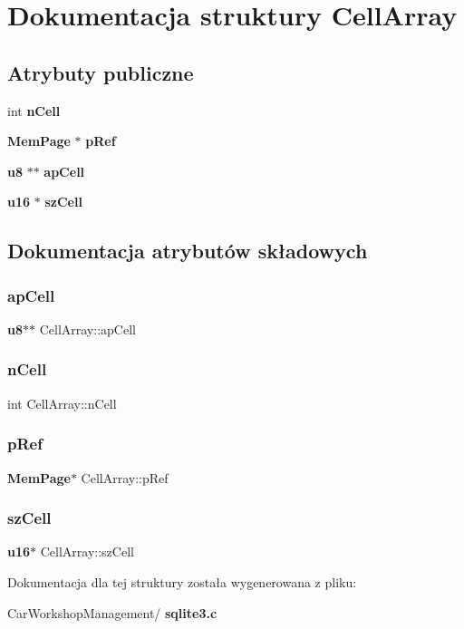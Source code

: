 \section{Dokumentacja struktury Cell\+Array}
\label{struct_cell_array}
\subsection*{Atrybuty publiczne}
\begin{DoxyCompactItemize}
\item 
int \textbf{ n\+Cell}
\item 
\textbf{ Mem\+Page} $\ast$ \textbf{ p\+Ref}
\item 
\textbf{ u8} $\ast$$\ast$ \textbf{ ap\+Cell}
\item 
\textbf{ u16} $\ast$ \textbf{ sz\+Cell}
\end{DoxyCompactItemize}


\subsection{Dokumentacja atrybutów składowych}
\mbox{\label{struct_cell_array_a70f7b19795ffe0c921484857721135a2}} 
\subsubsection{apCell}
{\footnotesize\ttfamily \textbf{ u8}$\ast$$\ast$ Cell\+Array\+::ap\+Cell}

\mbox{\label{struct_cell_array_a8fe33d4e52945d03ca96b4593995813d}} 
\subsubsection{nCell}
{\footnotesize\ttfamily int Cell\+Array\+::n\+Cell}

\mbox{\label{struct_cell_array_a14046c4bbf3090696f4e6909e94fa44d}} 
\subsubsection{pRef}
{\footnotesize\ttfamily \textbf{ Mem\+Page}$\ast$ Cell\+Array\+::p\+Ref}

\mbox{\label{struct_cell_array_a66bb706ff8b01135461c0a9f0b72c47b}} 
\subsubsection{szCell}
{\footnotesize\ttfamily \textbf{ u16}$\ast$ Cell\+Array\+::sz\+Cell}



Dokumentacja dla tej struktury została wygenerowana z pliku\+:\begin{DoxyCompactItemize}
\item 
Car\+Workshop\+Management/\textbf{ sqlite3.\+c}\end{DoxyCompactItemize}
